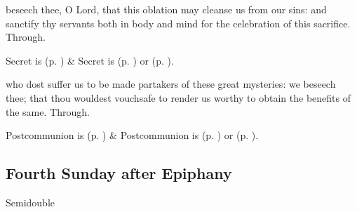 \secret
{} beseech thee, O Lord, that this oblation may cleanse us from our sins: and sanctify thy servants both in body and mind for the celebration of this sacrifice. Through.
\begin{rubric}
     Secret is  (p. \pageref{SPMaryPostChristmas}) \&  Secret is  (p. \pageref{SPAgainst}) or  (p. \pageref{SPChiefBishop}).
\end{rubric}
\postcommunion
{} who dost suffer us to be made partakers of these great mysteries: we beseech thee; that thou wouldest vouchsafe to render us worthy to obtain the benefits of the same. Through.
\begin{rubric}
     Postcommunion is  (p. \pageref{SPMaryPostChristmas}) \&  Postcommunion is  (p. \pageref{SPAgainst}) or  (p. \pageref{SPChiefBishop}).
\end{rubric}


\clearpage
\subsection{Fourth Sunday after Epiphany}
\begin{inhead}
{Semidouble}
\end{inhead}


